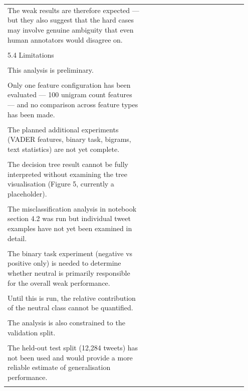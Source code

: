 \documentclass[11pt]{article}
\begin{document}
\begin{longtable}{|p{0.55\linewidth}|p{0.40\linewidth}|}
\hline
\rule{0pt}{3.5cm} & \\
\hline
The weak results are therefore expected --- but they also suggest that the hard cases may involve genuine ambiguity that even human annotators would disagree on. & \\[2pt]
\hline
\rule{0pt}{3.5cm} & \\
\hline
5.4 Limitations & \\[2pt]
\hline
\rule{0pt}{3.5cm} & \\
\hline
This analysis is preliminary. & \\[2pt]
\hline
\rule{0pt}{3.5cm} & \\
\hline
Only one feature configuration has been evaluated --- 100 unigram count features --- and no comparison across feature types has been made. & \\[2pt]
\hline
\rule{0pt}{3.5cm} & \\
\hline
The planned additional experiments (VADER features, binary task, bigrams, text statistics) are not yet complete. & \\[2pt]
\hline
\rule{0pt}{3.5cm} & \\
\hline
The decision tree result cannot be fully interpreted without examining the tree visualisation (Figure 5, currently a placeholder). & \\[2pt]
\hline
\rule{0pt}{3.5cm} & \\
\hline
The misclassification analysis in notebook section 4.2 was run but individual tweet examples have not yet been examined in detail. & \\[2pt]
\hline
\rule{0pt}{3.5cm} & \\
\hline
The binary task experiment (negative vs positive only) is needed to determine whether neutral is primarily responsible for the overall weak performance. & \\[2pt]
\hline
\rule{0pt}{3.5cm} & \\
\hline
Until this is run, the relative contribution of the neutral class cannot be quantified. & \\[2pt]
\hline
\rule{0pt}{3.5cm} & \\
\hline
The analysis is also constrained to the validation split. & \\[2pt]
\hline
\rule{0pt}{3.5cm} & \\
\hline
The held-out test split (12,284 tweets) has not been used and would provide a more reliable estimate of generalisation performance. & \\[2pt]
\hline
\rule{0pt}{3.5cm} & \\

\end{longtable}
\end{document}
